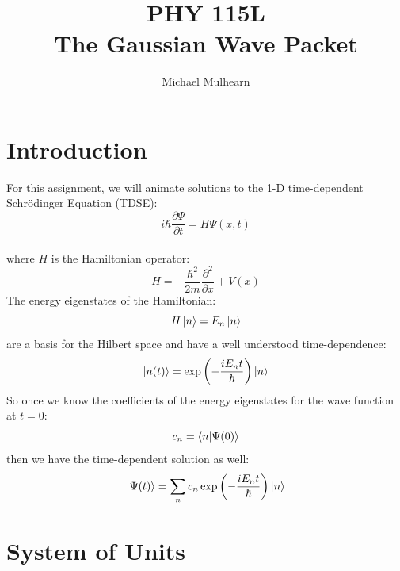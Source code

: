\documentclass[12pt]{article}
\begin{document}
\newcommand{\ihbar}{\ensuremath{i \hbar}}
\newcommand{\Pss}{\ensuremath{\Psi^*}}
\newcommand{\dPsidt}{\ensuremath{ \frac{\partial \Psi}{\partial t} }}
\newcommand{\dPsidx}{\ensuremath{ \frac{\partial \Psi}{\partial x} }}
\newcommand{\ddPsidx}{\ensuremath{ \frac{\partial^2 \Psi}{\partial x^2} }}
\newcommand{\dPssdt}{\ensuremath{ \frac{\partial \Psi^*}{\partial t} }}
\newcommand{\dPssdx}{\ensuremath{ \frac{\partial \Psi^*}{\partial x} }}
\newcommand{\ddPssdx}{\ensuremath{ \frac{\partial^2 \Psi^*}{\partial x^2} }}

\newcommand{\dphidt}{\ensuremath{ \frac{d \phi}{dt} }}
\newcommand{\dpsidx}{\ensuremath{ \frac{d \psi}{dx} }}
\newcommand{\ddpsidx}{\ensuremath{ \frac{d^2 \psi}{dx^2} }}

\title{PHY 115L \\ The Gaussian Wave Packet}
\author{Michael Mulhearn}

\maketitle

\section{Introduction}

For this assignment, we will animate solutions to the 1-D
time-dependent Schr\"odinger Equation (TDSE):
\begin{equation}
\label{eqn:se}
\ihbar \frac{\partial \Psi}{\partial t} = H \Psi(x,t)
\end{equation}\\[3pt]
where $H$ is the Hamiltonian operator:
$$H = - \frac{\hbar^2}{2 m} \frac{\partial^2}{\partial x} + V(x) $$
The energy eigenstates of the Hamiltonian:
$$H \ket{n} = E_n \ket{n}$$
are a basis for the Hilbert space and have a well understood time-dependence:
$$\ket{n(t)} = \exp{\left(- \frac{i E_n t}{\hbar}\right)} \ket{n}$$
So once we know the coefficients of the energy eigenstates for the wave function at $t=0$:
$$c_n = \braket{n|\Psi(0)}$$
then we have the time-dependent solution as well:
\begin{equation}
  \label{eqn:expansion}
 \ket{\Psi(t)} = \sum_n c_n \exp{\left(- \frac{i E_n t}{\hbar}\right)} \ket{n}
\end{equation}

\section{System of Units}
\end{document}
